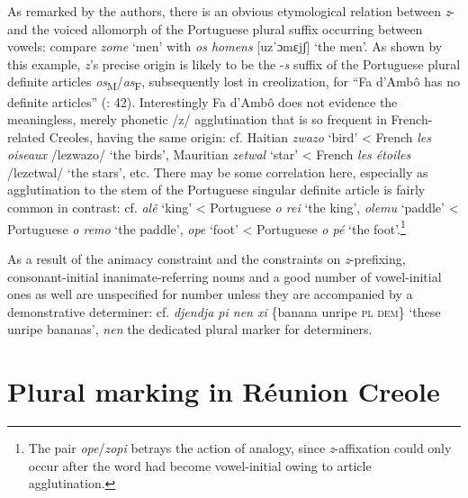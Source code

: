 \documentclass[output=paper]{langscibook}
\begin{document}
As remarked by the authors, there is an obvious etymological relation between \textit{z}{}- and the voiced allomorph of the Portuguese plural suffix occurring between vowels: compare \textit{zome} ‘men’ with \textit{os homens} [uzˈɔmɛjʃ] ‘the men’. As shown by this example, \textit{z}’s precise origin is likely to be the -\textit{s} suffix of the Portuguese plural definite articles \textit{os}\textsubscript{M}/\textit{as}\textsubscript{F}, subsequently lost in creolization, for “Fa d’Ambô has no definite articles” (\citealt{HagemeijerEtAl2020}: 42). Interestingly Fa d’Ambô does not evidence the meaningless, merely phonetic /z/ agglutination that is so frequent in French-related Creoles, having the same origin: cf. Haitian \textit{zwazo} ‘bird’ < French \textit{les oiseaux} /lezwazo/ ‘the birds’, Mauritian \textit{zetwal} ‘star’ < French \textit{les étoiles} /lezetwal/ ‘the stars’, etc. There may be some correlation here, especially as agglutination to the stem of the Portuguese singular definite article is fairly common in contrast: cf. \textit{alê} ‘king’ < Portuguese \textit{o rei} ‘the king’, \textit{olemu} ‘paddle’ < Portuguese \textit{o remo} ‘the paddle’, \textit{ope} ‘foot’ < Portuguese \textit{o pé} ‘the foot’.\footnote{The pair \textit{ope}\slash\textit{zopi} betrays the action of analogy, since \textit{z}{}-affixation could only occur after the word had become vowel-initial owing to article agglutination.}

As a result of the animacy constraint and the constraints on \textit{z}{}-prefixing, con\-so\-nant-ini\-tial inanimate-referring nouns and a good number of vowel-initial ones as well are unspecified for number unless they are accompanied by a demonstrative determiner: cf. \textit{djendja pi nen xi} \{banana unripe \textsc{pl} \textsc{dem}\} ‘these unripe bananas’, \textit{nen} the dedicated plural marker for determiners.

\section{Plural marking in Réunion Creole}
\label{sec:kihm:4}
\end{document}

